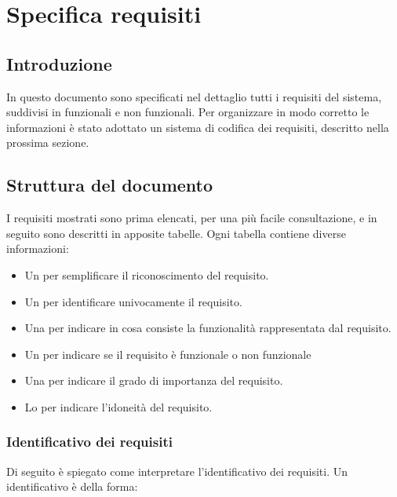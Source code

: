 \chapter{Specifica requisiti} 
\label{cha:specifica_requisiti}

\section{Introduzione} 
In questo documento sono specificati nel dettaglio tutti i requisiti del sistema, suddivisi in funzionali e non funzionali.
Per organizzare in modo corretto le informazioni è stato adottato un sistema di codifica dei requisiti, descritto nella prossima sezione.

\section{Struttura del documento}
\label{sec:struttura_del_documento}

I requisiti mostrati sono prima elencati, per una più facile consultazione, e in seguito sono descritti in apposite tabelle. 
Ogni tabella contiene diverse informazioni:
\begin{itemize}
	\item Un  per semplificare il riconoscimento del requisito.
	\item Un  per identificare univocamente il requisito.
	\item Una  per indicare in cosa consiste la funzionalità rappresentata dal requisito.
	\item Un  per indicare se il requisito è funzionale o non funzionale
	\item Una  per indicare il grado di importanza del requisito.
	\item Lo  per indicare l'idoneità del requisito.
\end{itemize}

\subsection{Identificativo dei requisiti}
\label{subsec:identificativo_dei_requisiti}

Di seguito è spiegato come interpretare l'identificativo dei requisiti.
Un identificativo è della forma:
\begin{center}
\end{center}

